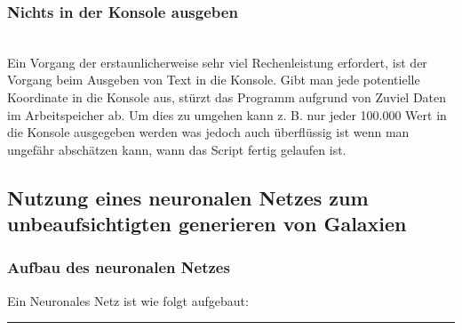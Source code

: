 \subsubsection{Nichts in der Konsole ausgeben}~\\
Ein Vorgang der erstaunlicherweise sehr viel Rechenleistung erfordert, ist
der Vorgang beim Ausgeben von Text in die Konsole. Gibt man jede potentielle
Koordinate in die Konsole aus, stürzt das Programm aufgrund von Zuviel Daten im Arbeitspeicher ab.
Um dies zu umgehen kann z. B. nur jeder 100.000 Wert in die Konsole ausgegeben
werden was jedoch auch überflüssig ist wenn man ungefähr abschätzen kann, wann
das Script fertig gelaufen ist.

\subsection{Nutzung eines neuronalen Netzes zum unbeaufsichtigten generieren von Galaxien}
\subsubsection{Aufbau des neuronalen Netzes}

Ein Neuronales Netz ist wie folgt aufgebaut:

\bigskip

\hrule

\bigskip


